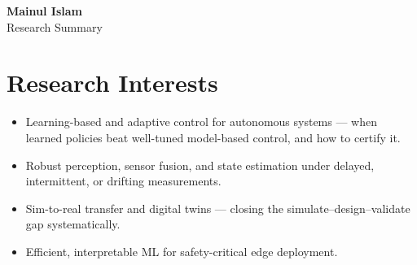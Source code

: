 \documentclass[10.5pt]{article}
\begin{document}
\begin{center}
    {\LARGE\bfseries Mainul Islam}\\[4pt]
    {\large Research Summary}
\end{center}

\vspace{2pt}

\section*{Research Interests}
\begin{itemize}
    \item Learning-based and adaptive control for autonomous systems --- when learned policies beat
    well-tuned model-based control, and how to certify it.
    \item Robust perception, sensor fusion, and state estimation under delayed, intermittent, or
    drifting measurements.
    \item Sim-to-real transfer and digital twins --- closing the simulate--design--validate gap
    systematically.
    \item Efficient, interpretable ML for safety-critical edge deployment.
\end{itemize}

\end{document}
